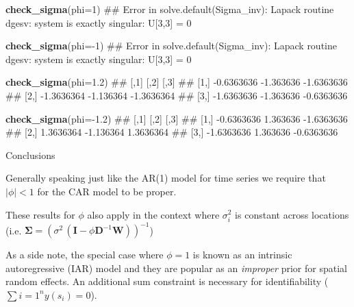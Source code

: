 \documentclass[11pt,ignorenonframetext,]{beamer}
\newenvironment{Shaded}{}{}
\newcommand{\KeywordTok}[1]{\textcolor[rgb]{0.00,0.44,0.13}{\textbf{#1}}}
\newcommand{\DataTypeTok}[1]{\textcolor[rgb]{0.56,0.13,0.00}{#1}}
\newcommand{\DecValTok}[1]{\textcolor[rgb]{0.25,0.63,0.44}{#1}}
\newcommand{\FloatTok}[1]{\textcolor[rgb]{0.25,0.63,0.44}{#1}}
\newcommand{\OperatorTok}[1]{\textcolor[rgb]{0.40,0.40,0.40}{#1}}
\newcommand{\NormalTok}[1]{#1}
\let\oldShaded\Shaded
\let\endoldShaded\endShaded
\renewenvironment{Shaded}{\footnotesize\begin{spacing}{0.9}\oldShaded}{\endoldShaded\end{spacing}}
\begin{document}
\begin{frame}[fragile]{}

\begin{Shaded}
\begin{Highlighting}[]
\KeywordTok{check_sigma}\NormalTok{(}\DataTypeTok{phi=}\DecValTok{1}\NormalTok{)}
\NormalTok{## Error in solve.default(Sigma_inv): Lapack routine dgesv: system is exactly singular: U[3,3] = 0}

\KeywordTok{check_sigma}\NormalTok{(}\DataTypeTok{phi=}\OperatorTok{-}\DecValTok{1}\NormalTok{)}
\NormalTok{## Error in solve.default(Sigma_inv): Lapack routine dgesv: system is exactly singular: U[3,3] = 0}

\KeywordTok{check_sigma}\NormalTok{(}\DataTypeTok{phi=}\FloatTok{1.2}\NormalTok{)}
\NormalTok{##            [,1]      [,2]       [,3]}
\NormalTok{## [1,] -0.6363636 -1.363636 -1.6363636}
\NormalTok{## [2,] -1.3636364 -1.136364 -1.3636364}
\NormalTok{## [3,] -1.6363636 -1.363636 -0.6363636}

\KeywordTok{check_sigma}\NormalTok{(}\DataTypeTok{phi=}\OperatorTok{-}\FloatTok{1.2}\NormalTok{)}
\NormalTok{##            [,1]      [,2]       [,3]}
\NormalTok{## [1,] -0.6363636  1.363636 -1.6363636}
\NormalTok{## [2,]  1.3636364 -1.136364  1.3636364}
\NormalTok{## [3,] -1.6363636  1.363636 -0.6363636}
\end{Highlighting}
\end{Shaded}

\end{frame}

\begin{frame}{Conclusions}

Generally speaking just like the AR(1) model for time series we require
that \(|\phi| < 1\) for the CAR model to be proper.

\vspace{4mm}

These results for \(\phi\) also apply in the context where
\(\sigma^2_i\) is constant across locations (i.e.
\(\bm\Sigma = (\sigma^2 \, (\bm{I}-\phi \bm{D}^{-1}\bm{W}))^{-1}\))

\vspace{8mm}

As a side note, the special case where \(\phi=1\) is known as an
intrinsic autoregressive (IAR) model and they are popular as an
\emph{improper} prior for spatial random effects. An additional sum
constraint is necessary for identifiability
(\(\sum{i=1}^n y(s_i) = 0\)).

\end{frame}
\end{document}
